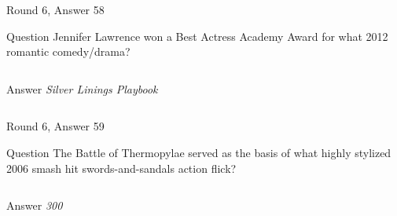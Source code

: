 \documentclass[11pt]{beamer}
\begin{document}
\begin{frame}[t]{Round 6, Answer 58}
  \vspace{2em}
  \begin{block}{Question}
    Jennifer Lawrence won a Best Actress Academy Award for what 2012 romantic comedy/drama?
  \end{block}
  \pause{}
  \begin{columns}[T,totalwidth=\linewidth]
    \begin{column}{0.35\linewidth}
      \begin{block}{Answer}
        \emph{Silver Linings Playbook}
      \end{block}
    \end{column}
    \begin{column}{0.6\linewidth}
      \begin{center}
        \texttt{[image: \{Images/silverlinings]}.jpg}
      \end{center}
    \end{column}
  \end{columns}
\end{frame}


\begin{frame}[t]{Round 6, Answer 59}
  \vspace{2em}
  \begin{block}{Question}
    The Battle of Thermopylae served as the basis of what highly stylized 2006 smash hit swords-and-sandals action flick?
  \end{block}
  \pause{}
  \begin{columns}[T,totalwidth=\linewidth]
    \begin{column}{0.35\linewidth}
      \begin{block}{Answer}
        \emph{300}
      \end{block}
    \end{column}
    \begin{column}{0.6\linewidth}
      \begin{center}
        \texttt{[image: \{Images/300movie]}.jpg}
      \end{center}
    \end{column}
  \end{columns}
\end{frame}
\end{document}
